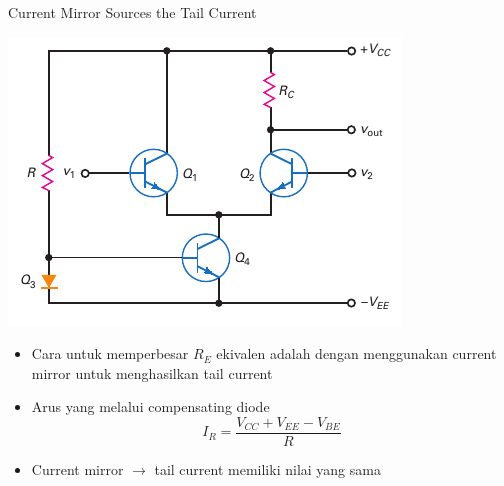 \documentclass[aspectratio=169]{beamer}
\begin{document}
\begin{frame}{Current Mirror Sources the Tail Current}
	\begin{multicols}{2}
		\begin{center}
			\includegraphics[height=0.6\textheight]{gambar/01.diff-amp/01.fig29}
		\end{center}
		\columnbreak
		\begin{itemize}
			\item Cara untuk memperbesar $ R_E $ ekivalen adalah dengan menggunakan current mirror untuk menghasilkan tail current
			\item Arus yang melalui compensating diode
			\begin{equation}\label{pers.25}
				I_R = \frac{V_{CC} + V_{EE} - V_{BE}}{R}
			\end{equation}
			\item Current mirror $\rightarrow$ tail current memiliki nilai yang sama
		\end{itemize}
	\end{multicols}
\end{frame}
\end{document}
